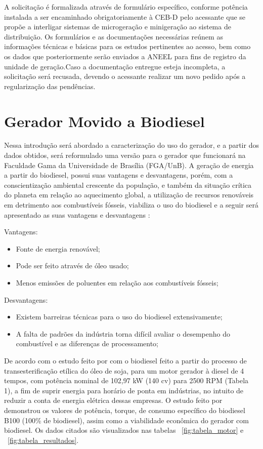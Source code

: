 A solicitação é formalizada através de formulário específico, conforme potência instalada  a ser encaminhado obrigatoriamente à CEB-D pelo acessante que se propõe a interligar sistemas de microgeração e minigeração ao sistema de distribuição. Os formulários e as documentações necessárias reúnem as informações técnicas e básicas para os estudos pertinentes ao acesso, bem como os dados que posteriormente serão enviados a ANEEL para fins de registro da unidade de geração.Caso a documentação entregue esteja incompleta, a solicitação será recusada, devendo o acessante realizar um novo pedido após a regularização das pendências.

\section{Gerador Movido a Biodiesel}

Nessa introdução será abordado a caracterização do uso do gerador, e a partir dos dados obtidos, será reformulado uma versão para o gerador que funcionará na Faculdade Gama da Universidade de Brasília (FGA/UnB).
A geração de energia a partir do biodiesel, possui suas vantagens e desvantagens, porém, com a conscientização ambiental crescente da população, e também da situação crítica do planeta em relação ao aquecimento global, a utilização de recursos renováveis em detrimento aos combustíveis fósseis, viabiliza o uso do biodiesel e a seguir será apresentado as suas vantagens e desvantagens \cite{critical}:

Vantagens:
\begin{itemize}
  \item Fonte de energia renovável;
  \item Pode ser feito através de óleo usado;
  \item Menos emissões de poluentes em relação aos combustíveis fósseis;
\end{itemize}

Desvantagens:
\begin{itemize}
  \item Existem barreiras técnicas para o uso do biodiesel extensivamente;
  \item A falta de padrões da indústria torna difícil avaliar o desempenho do combustível e as diferenças de processamento;
\end{itemize}

De acordo com o estudo feito por \cite{carlo} com o biodiesel feito a partir do processo de transesterificação etílica do óleo de soja, para um motor gerador à diesel de 4 tempos, com potência nominal de 102,97 kW (140 cv) para 2500 RPM (Tabela 1), a fim de suprir energia para horário de ponta em indústrias, no intuito de reduzir a conta de energia elétrica dessas empresas.
O estudo feito por \cite{carlo} demonstrou os valores de potência, torque, de consumo específico do biodiesel B100 (100\% de biodiesel), assim como a viabilidade econômica do gerador com biodiesel. Os dados citados são visualizados nas tabelas ~\ref{fig:tabela_motor} e ~\ref{fig:tabela_resultados}.

